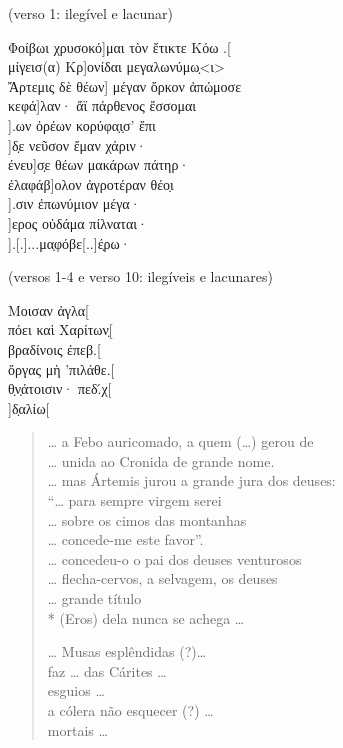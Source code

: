 \begin{gkverse}
\textnormal{(verso 1: ilegível e lacunar)}

Φοίβωι χρυσοκό]μαι τὸν ἔτικτε Κόω .[\\
μίγεισ(α)         Κρ]ονίδαι μεγαλωνύμω̣<ι>\\
Ἄρτεμις δὲ θέων] μέγαν ὄρκον ἀπώμοσε\\
    κεφά]λαν· ἄϊ πάρθενος ἔσσομαι\\
             ].ων ὀρέων κορύφα̣ι̣σ’ ἔπι\\
    ]δ̣ε νεῦσον ἔμαν χάριν·\\
         ένευ]σ̣ε θέων μακάρων πάτηρ·\\
ἐλαφάβ]ολον ἀγροτέραν θέο̣ι\\
            ].σιν ἐπωνύμιον μέγα·\\
   ]ερος οὐδάμα πίλναται·\\
     ].[.]...μα̣φόβε[..]έ̣ρω·

\textnormal{(versos 1-4 e verso 10: ilegíveis e lacunares)}

Μοισαν ἀγλα[\\
πόει καὶ Χαρίτων̣[\\
βραδίνοις ἐπεβ.[\\
ὄργας μὴ ’πιλάθε.[\\
θ̣ν̣άτοισιν· πεδ.́χ[\\
      ]δ̣αλίω[
\end{gkverse}
\pagebreak
\begin{verse}
\ldots{} a Febo auricomado, a quem (\ldots{}) gerou de \\
\ldots{} unida ao Cronida de grande nome.\\
\ldots{} mas Ártemis jurou a grande jura dos deuses:\\
``\ldots{} para sempre virgem serei\\
\ldots{} sobre os cimos das montanhas\\
\ldots{} concede-me este favor''.\\
\ldots{} concedeu-o o pai dos deuses venturosos\\
\ldots{} flecha-cervos, a selvagem, os deuses\\
\ldots{} grande título\\*
(Eros) dela nunca se achega \ldots{}

\ast\quad\ast\quad\ast

\ldots{} Musas esplêndidas (?)\ldots{}\\
faz \ldots{} das Cárites \ldots{}\\
esguios \ldots{}\\
a cólera não esquecer (?) \ldots{}\\
mortais \ldots{}
\end{verse}

